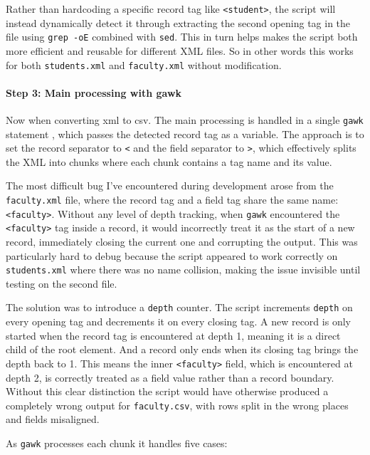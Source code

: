 \documentclass[12pt, a4paper]{report}
\begin{document}
Rather than hardcoding a specific record tag like \texttt{<student>}, the script will instead dynamically detect it through extracting the second opening tag in the file using \texttt{grep -oE} combined with \texttt{sed}. This in turn helps makes the script both more efficient and reusable for different XML files. So in other words this works for both \texttt{students.xml} and \texttt{faculty.xml} without modification.

\paragraph{Step 3: Main processing with gawk}

Now when converting xml to csv. The main processing is handled in a single \texttt{gawk} statement \cite{redswitches_gawk}, which passes the detected record tag as a variable. The approach is to set the record separator to \texttt{<} and the field separator to \texttt{>}, which effectively splits the XML into chunks where each chunk contains a tag name and its value.

The most difficult bug I've encountered during development arose from the \texttt{faculty.xml} file, where the record tag and a field tag share the same name: \texttt{<faculty>}. Without any level of depth tracking, when \texttt{gawk} encountered the \texttt{<faculty>} tag inside a record, it would incorrectly treat it as the start of a new record, immediately closing the current one and corrupting the output. This was particularly hard to debug because the script appeared to work correctly on \texttt{students.xml} where there was no name collision, making the issue invisible until testing on the second file.

The solution was to introduce a \texttt{depth} counter. The script increments \texttt{depth} on every opening tag and decrements it on every closing tag. A new record is only started when the record tag is encountered at depth 1, meaning it is a direct child of the root element. And a record only ends when its closing tag brings the depth back to 1. This means the inner \texttt{<faculty>} field, which is encountered at depth 2, is correctly treated as a field value rather than a record boundary. Without this clear distinction the script would have otherwise produced a completely wrong output for \texttt{faculty.csv}, with rows split in the wrong places and fields misaligned.

As \texttt{gawk} processes each chunk it handles five cases:
\end{document}
